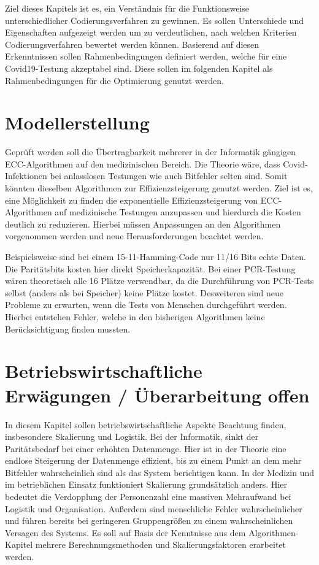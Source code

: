 Ziel dieses Kapitels ist es, ein Verständnis für die Funktionsweise unterschiedlicher Codierungsverfahren zu gewinnen.
Es sollen Unterschiede und Eigenschaften aufgezeigt werden um zu verdeutlichen, nach welchen Kriterien Codierungsverfahren bewertet werden können.
Basierend auf diesen Erkenntnissen sollen Rahmenbedingungen definiert werden, welche für eine Covid19-Testung akzeptabel sind.
Diese sollen im folgenden Kapitel als Rahmenbedingungen für die Optimierung genutzt werden.

\section{Modellerstellung}
Geprüft werden soll die Übertragbarkeit mehrerer in der Informatik gängigen ECC-Algorithmen auf den medizinischen Bereich.
Die Theorie wäre, dass Covid-Infektionen bei anlasslosen Testungen wie auch Bitfehler selten sind.
Somit könnten dieselben Algorithmen zur Effizienzsteigerung genutzt werden.
Ziel ist es, eine Möglichkeit zu finden die exponentielle Effizienzsteigerung von ECC-Algorithmen auf medizinische Testungen anzupassen und hierdurch die Kosten deutlich zu reduzieren.
Hierbei müssen Anpassungen an den Algorithmen vorgenommen werden und neue Herausforderungen beachtet werden.

Beispielsweise sind bei einem 15-11-Hamming-Code nur 11/16 Bits echte Daten.
Die Paritätsbits kosten hier direkt Speicherkapazität.
Bei einer PCR-Testung wären theoretisch alle 16 Plätze verwendbar, da die Durchführung von PCR-Tests selbst (anders als bei Speicher) keine Plätze kostet.
Desweiteren sind neue Probleme zu erwarten, wenn die Tests von Menschen durchgeführt werden.
Hierbei entstehen Fehler, welche in den bisherigen Algorithmen keine Berücksichtigung finden mussten.


\section{Betriebswirtschaftliche Erwägungen / Überarbeitung offen}
In diesem Kapitel sollen betriebswirtschaftliche Aspekte Beachtung finden, insbesondere Skalierung und Logistik.
Bei der Informatik, sinkt der Paritätsbedarf bei einer erhöhten Datenmenge.
Hier ist in der Theorie eine endlose Steigerung der Datenmenge effizient, bis zu einem Punkt an dem mehr Bitfehler wahrscheinlich sind als das System berichtigen kann.
In der Medizin und im betrieblichen Einsatz funktioniert Skalierung grundsätzlich anders.
Hier bedeutet die Verdopplung der Personenzahl eine massiven Mehraufwand bei Logistik und Organisation.
Außerdem sind menschliche Fehler wahrscheinlicher und führen bereits bei geringeren Gruppengrößen zu einem wahrscheinlichen Versagen des Systems.
Es soll auf Basis der Kenntnisse aus dem Algorithmen-Kapitel mehrere Berechnungsmethoden und Skalierungsfaktoren erarbeitet werden.


